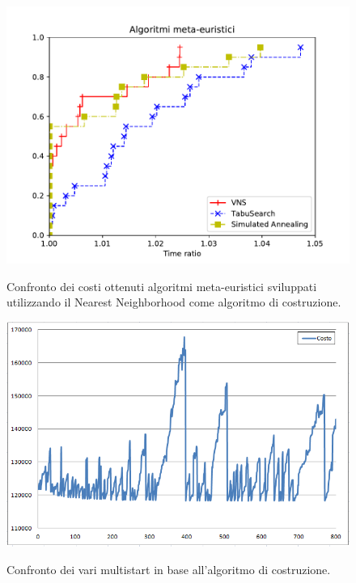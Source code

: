\begin{figure}[h] 
\begin{center} 
  \includegraphics[scale=0.8]{Images/pp_heuristic}\\ 
  \caption{\footnotesize{Confronto dei costi ottenuti algoritmi meta-euristici sviluppati utilizzando il Nearest Neighborhood come algoritmo di costruzione.}}
  \label{perf_profile} 
\end{center} 
\end{figure}

\begin{figure}[h] 
\begin{center} 
  \includegraphics[scale=0.8]{Images/cost_vns}\\ 
  \caption{\footnotesize{Confronto dei vari multistart in base all'algoritmo di costruzione.}}
  \label{perf_profile} 
\end{center} 
\end{figure}

